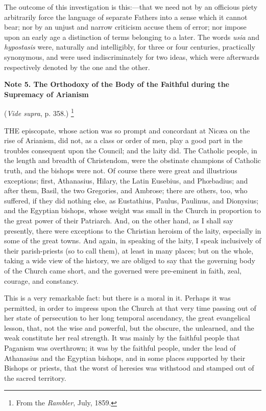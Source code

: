 The outcome of this investigation is this:—that we need not by an
officious piety arbitrarily force the language of separate Fathers
into a sense which it cannot bear; nor by an unjust and narrow
criticism accuse them of error; nor impose upon an early age a
distinction of terms belonging to a later. The words \emph{usia} and \emph{hypostasis}
were, naturally and intelligibly, for three or four centuries,
practically synonymous, and were used indiscriminately for two ideas,
which were afterwards respectively denoted by the one and the other.

\textbf{Note 5. The Orthodoxy of the Body of the
Faithful during the Supremacy of Arianism}

(\emph{Vide supra}, p. 358.)
\footnote{From the \emph{Rambler}, July, 1859.}

THE episcopate, whose action was so
prompt and concordant at Nicæa on the rise of Arianism, did not, as a
class or order of men, play a good part in the troubles consequent
upon the Council; and the laity did. The Catholic people, in the
length and breadth of Christendom, were the obstinate champions of
Catholic truth, and the bishops were not. Of course there were great
and illustrious exceptions; first, Athanasius, Hilary, the Latin
Eusebius, and Phœbadius; and after them, Basil, the two Gregories,
and Ambrose; there are others, too, who suffered, if they did nothing
else, as Eustathius, Paulus, Paulinus, and Dionysius; and the Egyptian
bishops, whose weight was small in the Church in proportion to the
great power of their Patriarch. And, on the other hand, as I shall say
presently, there were exceptions to the Christian heroism of the
laity, especially in some of the great towns. And again, in speaking
of the laity, I speak inclusively of their parish-priests (so to call
them), at least in many places; but on the whole, taking a wide view
of the history, we are obliged to say that the governing body of the
Church came short, and the governed were pre-eminent in faith, zeal,
courage, and constancy.

This is a very remarkable fact: but there is a moral in it. Perhaps
it was permitted, in order to impress upon the Church at that very
time passing out of her state of persecution to her long
temporal ascendancy, the great evangelical lesson, that, not the wise
and powerful, but the obscure, the unlearned, and the weak constitute
her real strength. It was mainly by the faithful people that Paganism
was overthrown; it was by the faithful people, under the lead of
Athanasius and the Egyptian bishops, and in some places supported by
their Bishops or priests, that the worst of heresies was withstood and
stamped out of the sacred territory.

